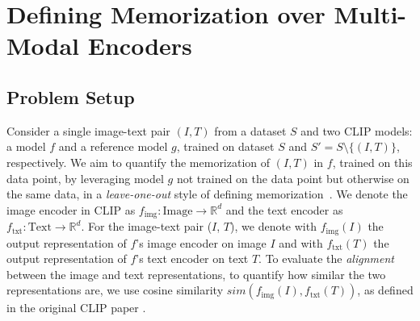 \section{Defining Memorization over Multi-Modal Encoders}
\label{sec:clipmem}



\subsection{Problem Setup}

Consider a single image-text pair $(I, T)$ from a dataset $S$ and two CLIP models: a model $f$ and a reference model $g$, trained on dataset $S$ and $S' = S \setminus \{(I, T)\}$, respectively.
We aim to quantify the memorization of $(I,T)$ in $f$, trained on this data point, by leveraging model $g$ not trained on the data point but otherwise on the same data, in a \textit{leave-one-out} style of defining memorization~\citep{feldman2020does}.
We denote the image encoder in CLIP as $f_{\text{img}}:\text{Image}\to \mathbb{R}^d$ and the text encoder as $f_{\text{txt}}:\text{Text}\to \mathbb{R}^d$. For the image-text pair ($I$, $T$), we denote with $f_{\text{img}}(I)$ the output representation of $f$'s image encoder on image $I$ and with $f_{\text{txt}}(T)$ the output representation of $f$'s text encoder on text $T$. To evaluate the \textit{alignment} between the image and text representations, \ie to quantify how similar the two representations are, we use cosine similarity $sim(f_{\text{img}}(I), f_{\text{txt}}(T))$, as defined in the original CLIP paper \citep{radford2021}.


